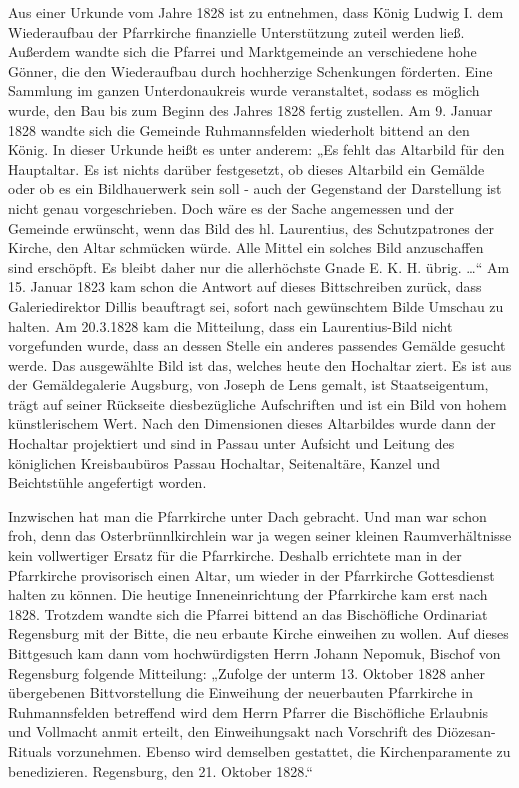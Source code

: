 \documentclass[12pt,a4paper]{book}
\begin{document}
Aus einer Urkunde vom Jahre 1828 ist zu entnehmen, dass König Ludwig I.
dem Wiederaufbau der Pfarrkirche finanzielle Unterstützung zuteil werden
ließ. Außerdem wandte sich die Pfarrei und Marktgemeinde an verschiedene
hohe Gönner, die den Wiederaufbau durch hochherzige Schenkungen
förderten. Eine Sammlung im ganzen Unterdonaukreis wurde veranstaltet,
sodass es möglich wurde, den Bau bis zum Beginn des Jahres 1828 fertig
zustellen. Am 9. Januar 1828 wandte sich die Gemeinde Ruhmannsfelden
wiederholt bittend an den König. In dieser Urkunde heißt es unter
anderem: „Es fehlt das Altarbild für den Hauptaltar. Es ist nichts
darüber festgesetzt, ob dieses Altarbild ein Gemälde oder ob es ein
Bildhauerwerk sein soll - auch der Gegenstand der Darstellung ist nicht
genau vorgeschrieben. Doch wäre es der Sache angemessen und der Gemeinde
erwünscht, wenn das Bild des hl. Laurentius, des Schutzpatrones der
Kirche, den Altar schmücken würde. Alle Mittel ein solches Bild
anzuschaffen sind erschöpft. Es bleibt daher nur die allerhöchste Gnade
E. K. H. übrig. …“ Am 15. Januar 1823 kam schon die Antwort auf dieses
Bittschreiben zurück, dass Galeriedirektor Dillis beauftragt sei, sofort
nach gewünschtem Bilde Umschau zu halten. Am 20.3.1828 kam die
Mitteilung, dass ein Laurentius-Bild nicht vorgefunden wurde, dass an
dessen Stelle ein anderes passendes Gemälde gesucht werde. Das
ausgewählte Bild ist das, welches heute den Hochaltar ziert. Es ist aus
der Gemäldegalerie Augsburg, von Joseph de Lens gemalt, ist
Staatseigentum, trägt auf seiner Rückseite diesbezügliche Aufschriften
und ist ein Bild von hohem künstlerischem Wert. Nach den Dimensionen
dieses Altarbildes wurde dann der Hochaltar projektiert und sind in
Passau unter Aufsicht und Leitung des königlichen Kreisbaubüros Passau
Hochaltar, Seitenaltäre, Kanzel und Beichtstühle angefertigt worden.

Inzwischen hat man die Pfarrkirche unter Dach gebracht. Und man war
schon froh, denn das Osterbrünnlkirchlein war ja wegen seiner kleinen
Raumverhältnisse kein vollwertiger Ersatz für die Pfarrkirche. Deshalb
errichtete man in der Pfarrkirche provisorisch einen Altar, um wieder in
der Pfarrkirche Gottesdienst halten zu können. Die heutige
Inneneinrichtung der Pfarrkirche kam erst nach 1828. Trotzdem wandte
sich die Pfarrei bittend an das Bischöfliche Ordinariat Regensburg mit
der Bitte, die neu erbaute Kirche einweihen zu wollen. Auf dieses
Bittgesuch kam dann vom hochwürdigsten Herrn Johann Nepomuk, Bischof von
Regensburg folgende Mitteilung: „Zufolge der unterm 13. Oktober 1828
anher übergebenen Bittvorstellung die Einweihung der neuerbauten
Pfarrkirche in Ruhmannsfelden betreffend wird dem Herrn Pfarrer die
Bischöfliche Erlaubnis und Vollmacht anmit erteilt, den Einweihungsakt
nach Vorschrift des Diözesan-Rituals vorzunehmen. Ebenso wird demselben
gestattet, die Kirchenparamente zu benedizieren. Regensburg, den 21.
Oktober 1828.“
\end{document}

